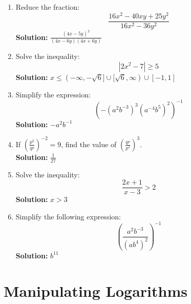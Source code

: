 \documentclass{article}
\begin{document}
\begin{enumerate}[leftmargin = 0.5cm, label = (\alph*), rightmargin = 0.2cm]
    \item Reduce the fraction:
    \[
    \frac{16x^2 - 40xy + 25y^2}{16x^2 - 36y^2}
    \]
    \textbf{Solution:} \( \frac{(4x - 5y)^2}{(4x - 6y)(4x + 6y)} \)

    \item Solve the inequality:
    \[
    |2x^2 - 7| \geq 5
    \]
    \textbf{Solution:} \( x \leq (-\infty, -\sqrt{6}]\cup [\sqrt{6}, \infty) \cup [-1, 1] \)

    \item Simplify the expression:
    \[
    \left( -(a^2b^{-3})^3(a^{-4}b^5)^2 \right)^{-1}
    \]
    \textbf{Solution:} \( -a^{2}b^{-1} \)

    \item If \( \left( \frac{p^2}{qr} \right)^{-2} = 9 \), find the value of \( \left( \frac{qr}{p^2} \right)^3 \). \\
    \textbf{Solution:} \( \frac{1}{27} \)

    \item Solve the inequality:
    \[
    \frac{2x + 1}{x - 3} > 2
    \]
    \textbf{Solution:} \( x > 3 \)

    \item Simplify the following expression:
    \[
    \left( \frac{a^2 b^{-3}}{(ab^4)^2} \right)^{-1}
    \]
    \textbf{Solution:} \( b^{11} \)

\end{enumerate}

\section{Manipulating Logarithms}
\end{document}
